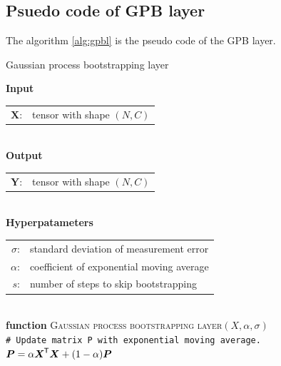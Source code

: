\documentclass[a4paper,onecolumn]{article}
\newcommand{\bs}[1]{\boldsymbol{#1}}
\newcommand{\tran}{^{\mkern-1.5mu\mathsf{T}}}
\begin{document}
\subsection{Psuedo code of GPB layer}

The algorithm \ref{alg:gpbl} is the pseudo code of the GPB layer.

\begin{algorithm}[t]
    \caption{Gaussian process bootstrapping layer}
    \label{alg:gpbl}
    \textbf{Input} \\
    \hspace*{\algorithmicindent}
    \begin{tabular}{rl}
        $\bs{X}$: & \hspace*{-10pt} tensor with shape $(N, C)$ \\
    \end{tabular} \\
    \textbf{Output} \\
    \hspace*{\algorithmicindent}
    \begin{tabular}{rl}
        $\bs{Y}$: & \hspace*{-10pt} tensor with shape $(N, C)$
    \end{tabular} \\
    \textbf{Hyperpatameters} \\
    \hspace*{\algorithmicindent}
    \begin{tabular}{rl}
        $\sigma$: & \hspace*{-10pt} standard deviation of measurement error \\
        $\alpha$: & \hspace*{-10pt} coefficient of exponential moving average \\
        $s$:      & \hspace*{-10pt} number of steps to skip bootstrapping \\
    \end{tabular} \\[10pt]
    \textbf{function}
    \textsc{Gaussian process bootstrapping layer}$(X, \alpha, \sigma)$ \\[5pt]
        \noindent\hspace*{\algorithmicindent}
        \texttt{\# Update matrix P with exponential moving average.} \\[1pt]
        \noindent\hspace*{\algorithmicindent}
        $\bs{P} = \alpha \bs{X}\tran \bs{X} + (1 - \alpha) \bs{P}$ \\


\end{algorithm}
\end{document}
